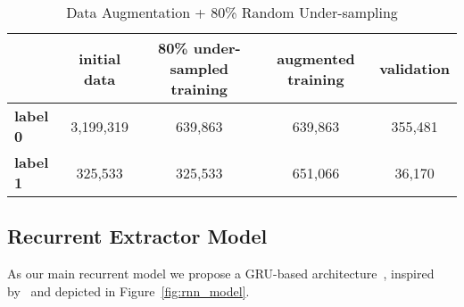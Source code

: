 \begin{enumerate}
    \begin{table}[ht]
        \centering
        \begin{tabular}{lcccc}
        \toprule
            & \textbf{initial data} & \textbf{80\% under-sampled training} & \textbf{augmented training} & \textbf{validation} \\
        \midrule
            \textbf{label 0} & 3,199,319 & 639,863 & 639,863 & 355,481 \\
            \textbf{label 1} & 325,533 & 325,533 & 651,066 & 36,170 \\
        \end{tabular}
        \caption{Data Augmentation + 80\% Random Under-sampling}\label{tab:data_augmentation}
    \end{table}
\end{enumerate}

\subsection{Recurrent Extractor Model}\label{subsec:rnn_model}
As our main recurrent model we propose a GRU-based architecture~\cite{cho-etal-2014-learning}, inspired by~\cite{zmandar-etal-2021-joint} and depicted in Figure~\ref{fig:rnn_model}. \\

